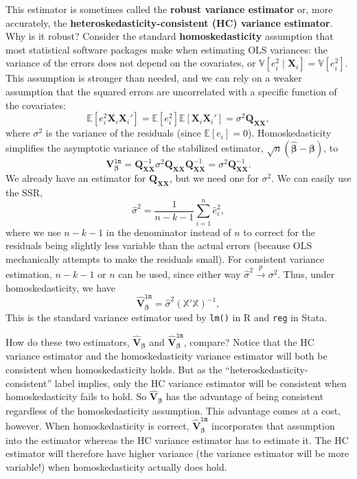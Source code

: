 \documentclass[
  13pt,
  letterpaper,
  DIV=11,
  numbers=noendperiod]{scrreprt}
\newcommand{\mb}{\symbf}
\newcommand{\E}{\mathbb{E}}
\newcommand{\V}{\mathbb{V}}
\newcommand{\X}{\mb{X}}
\newcommand{\Xmat}{\mathbb{X}}
\newcommand{\bfbeta}{\mb{\beta}}
\newcommand{\bhat}{\widehat{\mb{\beta}}}
\newcommand{\inprob}{\overset{p}{\to}}
\theoremstyle{definition}
\theoremstyle{definition}
\theoremstyle{plain}
\theoremstyle{remark}
\begin{document}
This estimator is sometimes called the \textbf{robust variance
estimator} or, more accurately, the
\textbf{heteroskedasticity-consistent (HC) variance estimator}. Why is
it robust? Consider the standard \textbf{homoskedasticity} assumption
that most statistical software packages make when estimating OLS
variances: the variance of the errors does not depend on the covariates,
or \(\V[e_{i}^{2} \mid \X_{i}] = \V[e_{i}^{2}]\). This assumption is
stronger than needed, and we can rely on a weaker assumption that the
squared errors are uncorrelated with a specific function of the
covariates: \[ 
\E[e_{i}^{2}\X_{i}\X_{i}'] = \E[e_{i}^{2}]\E[\X_{i}\X_{i}'] = \sigma^{2}\mb{Q}_{\X\X}, 
\] where \(\sigma^2\) is the variance of the residuals (since
\(\E[e_{i}] = 0\)). Homoskedasticity simplifies the asymptotic variance
of the stabilized estimator, \(\sqrt{n}(\bhat - \bfbeta)\), to \[ 
\mb{V}^{\texttt{lm}}_{\bfbeta} = \mb{Q}_{\X\X}^{-1}\sigma^{2}\mb{Q}_{\X\X}\mb{Q}_{\X\X}^{-1} = \sigma^2\mb{Q}_{\X\X}^{-1}.
\] We already have an estimator for \(\mb{Q}_{\X\X}\), but we need one
for \(\sigma^2\). We can easily use the SSR, \[ 
\widehat{\sigma}^{2} = \frac{1}{n-k-1} \sum_{i=1}^{n} \widehat{e}_{i}^{2},
\] where we use \(n-k-1\) in the denominator instead of \(n\) to correct
for the residuals being slightly less variable than the actual errors
(because OLS mechanically attempts to make the residuals small). For
consistent variance estimation, \(n-k -1\) or \(n\) can be used, since
either way \(\widehat{\sigma}^2 \inprob \sigma^2\). Thus, under
homoskedasticity, we have \[ 
\widehat{\mb{V}}_{\bfbeta}^{\texttt{lm}} = \widehat{\sigma}^{2}\left(\Xmat'\Xmat\right)^{{-1}},
\] This is the standard variance estimator used by \texttt{lm()} in R
and \texttt{reg} in Stata.

How do these two estimators, \(\widehat{\mb{V}}_{\bfbeta}\) and
\(\widehat{\mb{V}}_{\bfbeta}^{\texttt{lm}}\), compare? Notice that the
HC variance estimator and the homoskedasticity variance estimator will
both be consistent when homoskedasticity holds. But as the
``heteroskedasticity-consistent'' label implies, only the HC variance
estimator will be consistent when homoskedasticity fails to hold. So
\(\widehat{\mb{V}}_{\bfbeta}\) has the advantage of being consistent
regardless of the homoskedasticity assumption. This advantage comes at a
cost, however. When homoskedasticity is correct,
\(\widehat{\mb{V}}_{\bfbeta}^{\texttt{lm}}\) incorporates that
assumption into the estimator whereas the HC variance estimator has to
estimate it. The HC estimator will therefore have higher variance (the
variance estimator will be more variable!) when homoskedasticity
actually does hold.
\end{document}
